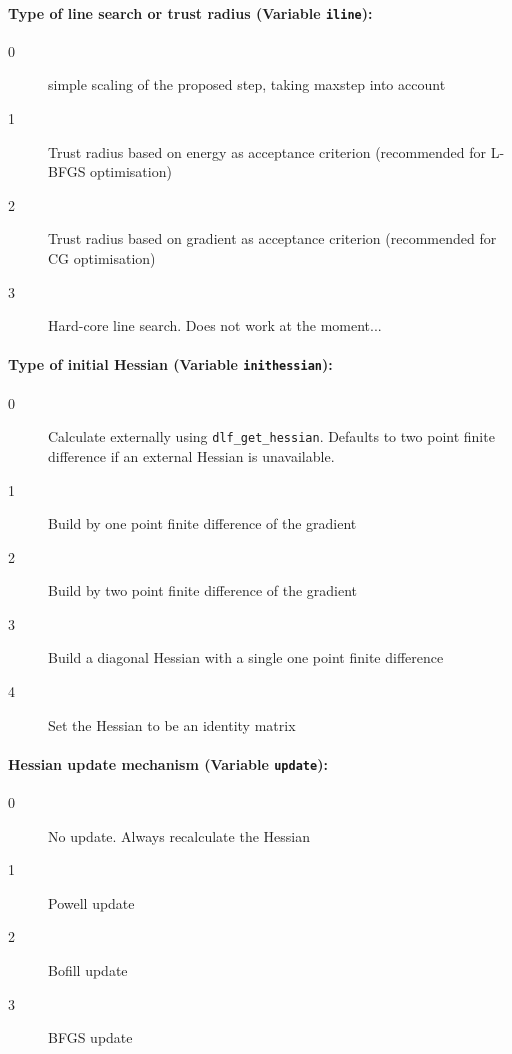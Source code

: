 \documentclass{article}
\begin{document}
\paragraph{Type of line search or trust radius (Variable \texttt{iline}):}
\begin{description}
\item[0]   simple scaling of the proposed step, taking maxstep into account
\item[1]   Trust radius based on energy as acceptance criterion (recommended
  for L-BFGS optimisation)
\item[2]   Trust radius based on gradient as acceptance criterion (recommended
  for CG optimisation)
\item[3]   Hard-core line search. Does not work at the moment...
\end{description}

\paragraph{Type of initial Hessian (Variable \texttt{inithessian}):}
\begin{description}
\item[0]   Calculate externally using \texttt{dlf\_get\_hessian}. Defaults to two point finite
  difference if an external Hessian is unavailable.
\item[1]   Build by one point finite difference of the gradient
\item[2]   Build by two point finite difference of the gradient
\item[3]   Build a diagonal Hessian with a single one point finite difference
\item[4]   Set the Hessian to be an identity matrix
\end{description}

\paragraph{Hessian update mechanism (Variable \texttt{update}):}
\begin{description}
\item[0]   No update. Always recalculate the Hessian
\item[1]   Powell update \cite{pow71}
\item[2]   Bofill update \cite{bof94}
\item[3]   BFGS update
\end{description}
\end{document}
